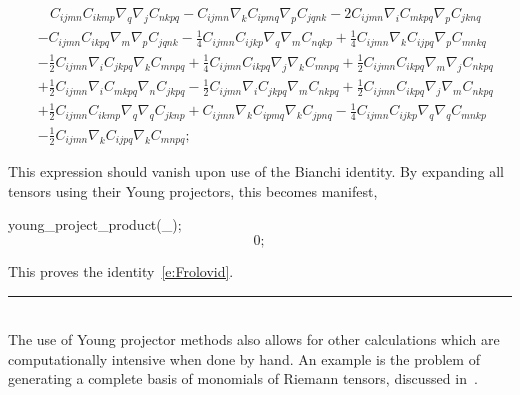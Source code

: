 \documentclass[11pt]{article}
\newenvironment{hanging}
    {\begin{list}{}{\setlength\itemsep{0pt}%
 \setlength\topsep{0pt}%
 \setlength\leftmargin{25pt}%
 \setlength\itemindent{0pt}%
 \setlength\listparindent{\itemindent}}%
     \item[]}
    {\end{list}}
\newcommand{\botrule}{\noindent\hspace{25pt}\rule{435pt}{.1pt}\\[2ex]}
\newenvironment{cdbcont}{\fvset{firstnumber=last}\color[named]{Blue}\Verbatim}{\endVerbatim}
\newenvironment{cdbout}{\vspace{-1ex}\begin{equation}}{\end{equation}\vspace{-1ex}}
\newenvironment{cdbcom}{\begin{hanging}}{\end{hanging}}
\begin{document}
\begin{cdbout}
\begin{aligned}
& ~~~~ C_{i j m n} C_{i k m p} \nabla_{q}{\nabla_{j}{C_{n k p q}}} 
- C_{i j m n} \nabla_{k}{C_{i p m q}} \nabla_{p}{C_{j q n k}} 
- 2 C_{i j m n} \nabla_{i}{C_{m k p q}} \nabla_{p}{C_{j k n q}} \\
&- C_{i j m n} C_{i k p q} \nabla_{m}{\nabla_{p}{C_{j q n k}}} 
- \frac{1}{4} C_{i j m n} C_{i j k p} \nabla_{q}{\nabla_{m}{C_{n q k p}}} 
+ \frac{1}{4} C_{i j m n} \nabla_{k}{C_{i j p q}} \nabla_{p}{C_{m n k q}} \\
&- \frac{1}{2} C_{i j m n} \nabla_{i}{C_{j k p q}} \nabla_{k}{C_{m n p q}} 
+ \frac{1}{4} C_{i j m n} C_{i k p q} \nabla_{j}{\nabla_{k}{C_{m n p q}}} 
+ \frac{1}{2} C_{i j m n} C_{i k p q} \nabla_{m}{\nabla_{j}{C_{n k p q}}} \\
&+ \frac{1}{2} C_{i j m n} \nabla_{i}{C_{m k p q}} \nabla_{n}{C_{j k p q}} 
- \frac{1}{2} C_{i j m n} \nabla_{i}{C_{j k p q}} \nabla_{m}{C_{n k p q}} 
+ \frac{1}{2} C_{i j m n} C_{i k p q} \nabla_{j}{\nabla_{m}{C_{n k p q}}}\\ 
&+ \frac{1}{2} C_{i j m n} C_{i k m p} \nabla_{q}{\nabla_{q}{C_{j k n p}}} 
+ C_{i j m n} \nabla_{k}{C_{i p m q}} \nabla_{k}{C_{j p n q}} 
- \frac{1}{4} C_{i j m n} C_{i j k p} \nabla_{q}{\nabla_{q}{C_{m n k p}}} \\
&- \frac{1}{2} C_{i j m n} \nabla_{k}{C_{i j p q}} \nabla_{k}{C_{m n p q}};
\end{aligned}
\end{cdbout}
\begin{cdbcom}
This expression should vanish upon use of the Bianchi identity. By
expanding all tensors using their Young projectors, this becomes manifest,
\end{cdbcom}
\begin{cdbcont}
young_project_product(_);
\end{cdbcont}
\begin{cdbout}
0;
\end{cdbout}
\begin{cdbcom}
This proves the identity~\eqref{e:Frolovid}.
\end{cdbcom}
\botrule
The use of Young projector methods also allows for other calculations
which are computationally intensive when done by hand. An example is
the problem of generating a complete basis of monomials of Riemann
tensors, discussed in~\cite{Peeters:2006kp}. 

\end{document}
